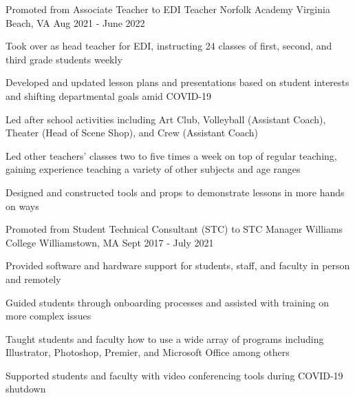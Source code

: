 \begin{cventries}
    \cventry
    {Promoted from Associate Teacher to EDI Teacher}
    {Norfolk Academy}
    {Virginia Beach, VA}
    {Aug 2021 - June 2022}
    {
      \begin{cvitems}
        \item {Took over as head teacher for EDI, instructing 24 classes of first, second, and third grade students weekly}
        \item {Developed and updated lesson plans and presentations based on student interests and shifting departmental goals amid COVID-19}
        \item {Led after school activities including Art Club, Volleyball (Assistant Coach), Theater (Head of Scene Shop), and Crew (Assistant Coach)}
        \item{Led other teachers' classes two to five times a week on top of regular teaching, gaining experience teaching a variety of other subjects and age ranges}
        \item{Designed and constructed tools and props to demonstrate lessons in more hands on ways}
      \end{cvitems}
    }
    \cventry
    {Promoted from Student Technical Consultant (STC) to STC Manager}
    {Williams College}
    {Williamstown, MA}
    {Sept 2017 - July 2021}
    {
      \begin{cvitems}
        \item {Provided software and hardware support for students, staff, and faculty in person and remotely}
        \item {Guided students through onboarding processes and assisted with training on more complex issues}
        \item {Taught students and faculty how to use a wide array of programs including Illustrator, Photoshop, Premier, and Microsoft Office among others}
        \item{Supported students and faculty with video conferencing tools during COVID-19 shutdown}
      \end{cvitems}
    }
\end{cventries}
